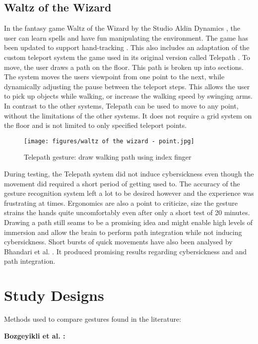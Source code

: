 \subsection{Waltz of the Wizard}
In the fantasy game Waltz of the Wizard \cite{WaWizOculus} by the Studio Aldin Dynamics \cite{Aladin}, the user can learn spells and have fun manipulating the environment. The game has been updated to support hand-tracking \cite{WaWizBlog}. This also includes an adaptation of the custom teleport system the game used in its original version called Telepath \cite{WaWizTelePath}. To move, the user draws a path on the floor. This path is broken up into sections. The system moves the users viewpoint from one point to the next, while dynamically adjusting the pause between the teleport steps. This allows the user to pick up objects while walking, or increase the walking speed by swinging arms. In contrast to the other systems, Telepath can be used to move to any point, without the limitations of the other systems. It does not require a grid system on the floor and is not limited to only specified teleport points.

\begin{figure}[htb]
  \centering
  \texttt{[image: figures/waltz of the wizard - point.jpg]}
  \caption{Telepath gesture: draw walking path using index finger}
  \label{fig:telepath}
\end{figure}

During testing, the Telepath system did not induce cybersickness even though the movement did required a short period of getting used to. The accuracy of the gesture recognition system left a lot to be desired however and the experience was frustrating at times. Ergonomics are also a point to criticize, size the gesture strains the hands quite uncomfortably even after only a short test of 20 minutes. Drawing a path still seams to be a promising idea and might enable high levels of immersion and allow the brain to perform path integration while not inducing cybersickness. Short bursts of quick movements have also been analysed by Bhandari et al. \cite{Bhandari}. It produced promising results regarding cybersickness and and path integration. 

\section{Study Designs}
Methods used to compare gestures found in the literature:


\textbf{Bozgeyikli et al. \cite{bozgeyikli}:}

